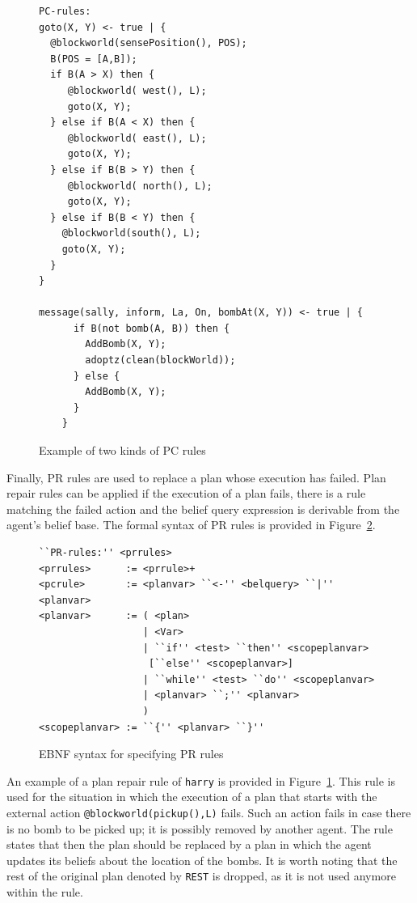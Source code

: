 \documentclass[a4paper]{article}
\begin{document}
\begin{figure}[htp]
\begin{verbatim}
PC-rules:
goto(X, Y) <- true | {
  @blockworld(sensePosition(), POS);
  B(POS = [A,B]);
  if B(A > X) then {
     @blockworld( west(), L);
     goto(X, Y);
  } else if B(A < X) then {
     @blockworld( east(), L);
     goto(X, Y);
  } else if B(B > Y) then {
     @blockworld( north(), L);
     goto(X, Y);
  } else if B(B < Y) then {
    @blockworld(south(), L);
    goto(X, Y);
  }
}

message(sally, inform, La, On, bombAt(X, Y)) <- true | {
	  if B(not bomb(A, B)) then { 
	    AddBomb(X, Y);
	    adoptz(clean(blockWorld));
	  } else { 
	    AddBomb(X, Y);
	  }
	}
\end{verbatim}
\caption{Example of two kinds of PC rules}
\label{fig:example_pcrules}
\end{figure}

Finally, PR rules are used to replace a plan whose execution has failed. Plan repair rules can be applied if the execution of a plan fails, there is a rule matching the failed action and the belief query expression is derivable from the agent's belief base. The formal syntax of PR rules is provided in Figure~\ref{fig:ebnf_prrules}.

\begin{figure}[htp]
\begin{verbatim}
``PR-rules:'' <prrules>
<prrules>      := <prrule>+
<pcrule>       := <planvar> ``<-'' <belquery> ``|'' <planvar>
<planvar>      := ( <plan>
                  | <Var>
                  | ``if'' <test> ``then'' <scopeplanvar>
                   [``else'' <scopeplanvar>]
                  | ``while'' <test> ``do'' <scopeplanvar> 
                  | <planvar> ``;'' <planvar>
                  )
<scopeplanvar> := ``{'' <planvar> ``}''
\end{verbatim}
\caption{EBNF syntax for specifying PR rules}
\label{fig:ebnf_prrules}
\end{figure}

An example of a plan repair rule of \texttt{harry} is provided in Figure~\ref{fig:example_pcrules}. This rule is used for the situation in which the execution of a plan that starts with the external action \texttt{@blockworld(pickup(),L)} fails. Such an action fails in case there is no bomb to be picked up; it is possibly removed by another agent. The rule states that then the plan should be replaced by a plan in which the agent updates its beliefs about the location of the bombs. It is worth noting that the rest of the original plan denoted by \texttt{REST} is dropped, as it is not used anymore within the rule.
\end{document}
